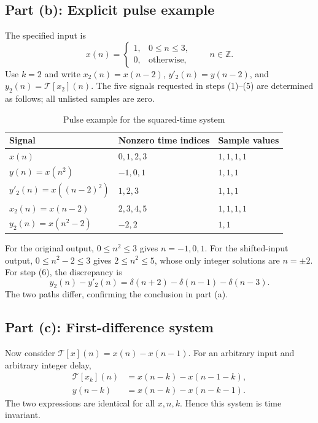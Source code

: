 \subsection{Part (b): Explicit pulse example}
The specified input is
\begin{equation}
  x(n)=\begin{cases}1,&0\leq n\leq3,\\0,&\text{otherwise},\end{cases}
  \qquad n\in\mathbb{Z}.
\end{equation}
Use $k=2$ and write $x_2(n)=x(n-2)$,
$y'_2(n)=y(n-2)$, and $y_2(n)=\mathcal{T}[x_2](n)$.
The five signals requested in steps (1)--(5) are determined as follows;
all unlisted samples are zero.
\begin{table}[H]
  \centering
  \caption{Pulse example for the squared-time system}
  \label{tab:p26b}
  \begin{tabular}{lll}
    \toprule
    Signal & Nonzero time indices & Sample values\\
    \midrule
    $x(n)$ & $0,1,2,3$ & $1,1,1,1$\\
    $y(n)=x(n^2)$ & $-1,0,1$ & $1,1,1$\\
    $y'_2(n)=x((n-2)^2)$ & $1,2,3$ & $1,1,1$\\
    $x_2(n)=x(n-2)$ & $2,3,4,5$ & $1,1,1,1$\\
    $y_2(n)=x(n^2-2)$ & $-2,2$ & $1,1$\\
    \bottomrule
  \end{tabular}
\end{table}
For the original output, $0\leq n^2\leq3$ gives $n=-1,0,1$.
For the shifted-input output, $0\leq n^2-2\leq3$ gives
$2\leq n^2\leq5$, whose only integer solutions are $n=\pm2$.
For step (6), the discrepancy is
\begin{equation}
  y_2(n)-y'_2(n)=\delta(n+2)-\delta(n-1)-\delta(n-3).
\end{equation}
The two paths differ, confirming the conclusion in part (a).

\subsection{Part (c): First-difference system}
Now consider $\mathcal{T}[x](n)=x(n)-x(n-1)$. For an arbitrary input
and arbitrary integer delay,
\begin{align}
  \mathcal{T}[x_k](n)&=x(n-k)-x(n-1-k),\\
  y(n-k)&=x(n-k)-x(n-k-1).
\end{align}
The two expressions are identical for all $x,n,k$. Hence this system
is time invariant.

